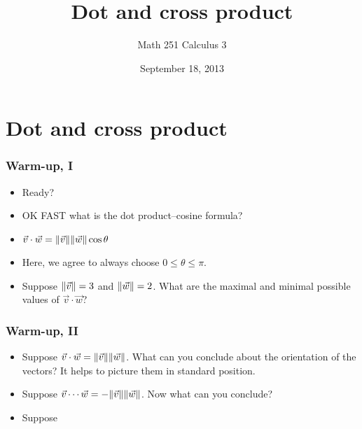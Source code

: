 \documentclass[11pt,ignorenonframetext,]{beamer}
\title{Dot and cross product}
\author{Math 251 Calculus 3}
\date{September 18, 2013 }
\begin{document}
\frame{\titlepage}

\section{Dot and cross product}

\begin{frame}\frametitle{Warm-up, I}

\begin{itemize}[<+->]
\itemsep1pt\parskip0pt
\item
  Ready?
\item
  OK FAST what is the dot product--cosine formula?
\item
  $\vec{v} \cdot \vec{w} = \lVert \vec{v} \rVert \lVert \vec{w} \rVert \cos{\theta}$
\item
  Here, we agree to always choose $0 \leq \theta \leq \pi$.
\item
  Suppose $\lVert \vec{v} \rVert = 3$ and $\lVert \vec{w} \rVert = 2$. What are the
  maximal and minimal possible values of $\vec{v} \cdot \vec{w}$?
\end{itemize}

\end{frame}

\begin{frame}\frametitle{Warm-up, II}

\begin{itemize}[<+->]
\item
  Suppose $\vec{v} \cdot \vec{w} = \lVert \vec{v} \rVert \lVert \vec{w} \rVert$. What
  can you conclude about the orientation of the vectors? It helps to
  picture them in standard position.
\item
  Suppose $\vec{v} \cdots \vec{w} = -\lVert \vec{v} \rVert \lVert \vec{w} \rVert$. Now
  what can you conclude?
\item
  Suppose
\end{itemize}

\end{frame}
\end{document}
